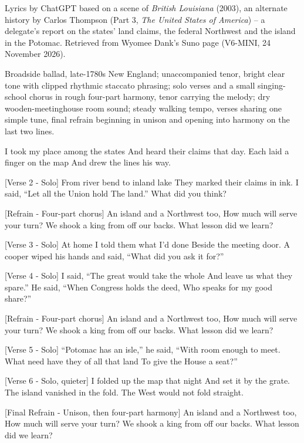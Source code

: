 \begin{notes}
Lyrics by ChatGPT based on a scene of \emph{British Louisiana} (2003), an alternate history by Carlos Thompson (Part 3, \emph{The United States of America}) -- a delegate's report on the states' land claims, the federal Northwest and the island in the Potomac. Retrieved from Wyomee Dank's Suno page (V6-MINI, 24 November 2026).
\end{notes}
\begin{style}
Broadside ballad, late-1780s New England; unaccompanied tenor, bright clear tone with clipped rhythmic staccato phrasing; solo verses and a small singing-school chorus in rough four-part harmony, tenor carrying the melody; dry wooden-meetinghouse room sound; steady walking tempo, verses sharing one simple tune, final refrain beginning in unison and opening into harmony on the last two lines.
\end{style}
\begin{lyrics}
I took my place among the states
And heard their claims that day.
Each laid a finger on the map
And drew the lines his way.

[Verse 2 - Solo]
From river bend to inland lake
They marked their claims in ink.
I said, “Let all the Union hold
The land.” What did you think?

[Refrain - Four-part chorus]
An island and a Northwest too,
How much will serve your turn?
We shook a king from off our backs.
What lesson did we learn?

[Verse 3 - Solo]
At home I told them what I’d done
Beside the meeting door.
A cooper wiped his hands and said,
“What did you ask it for?”

[Verse 4 - Solo]
I said, “The great would take the whole
And leave us what they spare.”
He said, “When Congress holds the deed,
Who speaks for my good share?”

[Refrain - Four-part chorus]
An island and a Northwest too,
How much will serve your turn?
We shook a king from off our backs.
What lesson did we learn?

[Verse 5 - Solo]
“Potomac has an isle,” he said,
“With room enough to meet.
What need have they of all that land
To give the House a seat?”

[Verse 6 - Solo, quieter]
I folded up the map that night
And set it by the grate.
The island vanished in the fold.
The West would not fold straight.

[Final Refrain - Unison, then four-part harmony]
An island and a Northwest too,
How much will serve your turn?
We shook a king from off our backs.
What lesson did we learn?
\end{lyrics}


